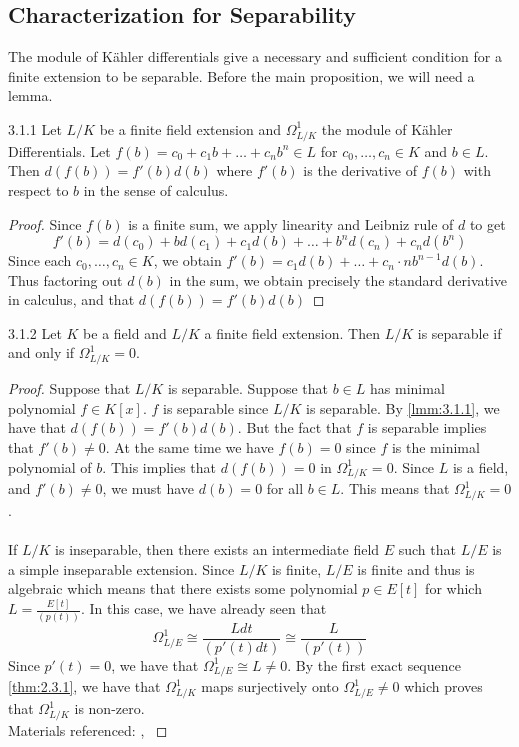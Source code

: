 \documentclass[a4paper]{article}
\begin{document}
\subsection{Characterization for Separability}
The module of Kähler differentials give a necessary and sufficient condition for a finite extension to be separable. Before the main proposition, we will need a lemma. 

\begin{lmm}{}{3.1.1} Let $L/K$ be a finite field extension and $\Omega_{L/K}^1$ the module of Kähler Differentials. Let $f(b)=c_0+c_1b+\dots+c_nb^n\in L$ for $c_0,\dots,c_n\in K$ and $b\in L$. Then $d(f(b))=f'(b)d(b)$ where $f'(b)$ is the derivative of $f(b)$ with respect to $b$ in the sense of calculus. 
\begin{proof}
Since $f(b)$ is a finite sum, we apply linearity and Leibniz rule of $d$ to get $$f'(b)=d(c_0)+bd(c_1)+c_1d(b)+\dots+b^nd(c_n)+c_nd(b^n)$$ Since each $c_0,\dots,c_n\in K$, we obtain $f'(b)=c_1d(b)+\dots+c_n\cdot nb^{n-1}d(b)$. Thus factoring out $d(b)$ in the sum, we obtain precisely the standard derivative in calculus, and that $d(f(b))=f'(b)d(b)$
\end{proof}
\end{lmm}

\begin{prp}{}{3.1.2} Let $K$ be a field and $L/K$ a finite field extension. Then $L/K$ is separable if and only if $\Omega_{L/K}^1=0$. 
\begin{proof}
Suppose that $L/K$ is separable. Suppose that $b\in L$ has minimal polynomial $f\in K[x]$. $f$ is separable since $L/K$ is separable. By \ref{lmm:3.1.1}, we have that $d(f(b))=f'(b)d(b)$. But the fact that $f$ is separable implies that $f'(b)\neq 0$. At the same time we have $f(b)=0$ since $f$ is the minimal polynomial of $b$. This implies that $d(f(b))=0$ in $\Omega_{L/K}^1=0$. Since $L$ is a field, and $f'(b)\neq 0$, we must have $d(b)=0$ for all $b\in L$. This means that $\Omega_{L/K}^1=0$. \\~\\

If $L/K$ is inseparable, then there exists an intermediate field $E$ such that $L/E$ is a simple inseparable extension. Since $L/K$ is finite, $L/E$ is finite and thus is algebraic which means that there exists some polynomial $p\in E[t]$ for which $L=\frac{E[t]}{(p(t))}$. In this case, we have already seen that $$\Omega_{L/E}^1\cong\frac{Ldt}{(p'(t)dt)}\cong\frac{L}{(p'(t))}$$ Since $p'(t)=0$, we have that $\Omega_{L/E}^1\cong L\neq 0$. By the first exact sequence \ref{thm:2.3.1}, we have that $\Omega_{L/K}^1$ maps surjectively onto $\Omega_{L/E}^1\neq 0$ which proves that $\Omega_{L/K}^1$ is non-zero. \\
Materials referenced: \cite{Per}, \cite{Liu}
\end{proof}
\end{prp}
\end{document}
